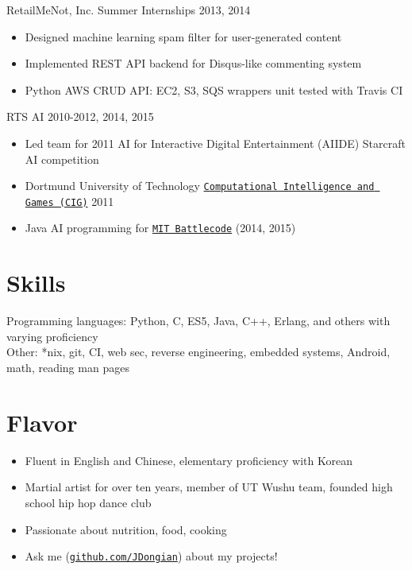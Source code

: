 \documentclass[line,margin]{res}
\begin{document}
\begin{resume}
    \vspace{-8pt}
    RetailMeNot, Inc. Summer Internships
    \hfill  2013, 2014
        \begin{itemize} \itemsep -2pt
        \item Designed machine learning spam filter for user-generated content
        \item Implemented REST API backend for Disqus-like commenting system
        \item Python AWS CRUD API: EC2, S3, SQS wrappers unit tested with Travis CI
        \end{itemize}

    \vspace{-8pt}
    RTS AI
    \hfill  2010-2012, 2014, 2015
        \begin{itemize} \itemsep -2pt
        \item Led team for 2011 AI for Interactive Digital Entertainment (AIIDE) Starcraft AI competition  
        \item Dortmund University of Technology \href{https://www.s11-www.cs.uni-dortmund.de/rts-competition/starcraft-cig2011}{\texttt{Computational Intelligence and Games (CIG)}} 2011
        \item Java AI programming for \href{http://www.battlecode.org/}{\texttt{MIT Battlecode}} (2014, 2015)
        \end{itemize}


\vspace{-8pt}
\section{Skills}
    \vspace{12pt} 
    Programming languages: Python, C, ES5, Java, C++, Erlang, and others with varying proficiency\\ 
    Other: *nix, git, CI, web sec, reverse engineering, embedded systems, Android, math, reading man pages


\vspace{-8pt}
\section{Flavor} 
    \vspace{22pt}
        \begin{itemize} \itemsep -2pt
        \item Fluent in English and Chinese, elementary proficiency with Korean
        \item Martial artist for over ten years, member of UT Wushu team, founded high school hip hop dance club
        \item Passionate about nutrition, food, cooking
        \item Ask me (\href{https://www.github.com/JDongian}{\texttt{github.com/JDongian}}) about my projects! 
        \end{itemize}

\end{resume} 
\end{document}
